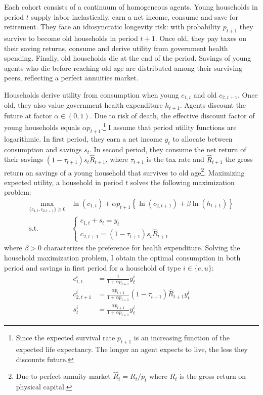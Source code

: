 Each cohort consists of a continuum of homogeneous agents. Young households in period $t$ supply labor inelastically, earn a net income, consume and save for retirement. They face an idiosyncratic longevity risk: with probability $p_{t+1}$ they survive to become old households in period $t+1$. Once old, they pay taxes on their saving returns, consume and derive utility from government health spending. Finally, old households die at the end of the period. Savings of young agents who die before reaching old age are distributed among their surviving peers, reflecting a perfect annuities market.

Households derive utility from consumption when young $c_{1,t}$ and old $c_{2,t+1}$. Once old, they also value government health expenditure $h_{t+1}$. Agents discount the future at factor $\alpha \in \left(0,1\right)$. Due to risk of death, the effective discount factor of young households equals $\alpha p_{t+1}$.\footnote{Since the expected survival rate $p_{t+1}$ is an increasing function of the expected life expectancy. The longer an agent expects to live, the less they discounts future.} I assume that period utility functions are logarithmic. In first period, they earn a net income $y_t$ to allocate between consumption and savings $s_t$. In second period, they consume the net return of their savings $(1-\tau_{t+1}) s_t \hat{R}_{t+1}$, where $\tau_{t+1}$ is the tax rate and $\hat{R}_{t+1}$ the gross return on savings of a young household that survives to old age\footnote{Due to perfect annuity market $\hat{R}_t = R_t/p_t$ where $R_t$ is the gross return on physical capital.}. Maximizing expected utility, a household in period $t$ solves the following maximization problem:
	\begin{align*}
		\max_{\lbrace c_{1,t}, c_{2,t+1} \rbrace \geq 0} &\ln(c_{1,t}) + \alpha p_{t+1}\left\lbrace \ln(c_{2,t+1}) + \beta \ln(h_{t+1}) \right\rbrace\\
		\text{s.t.} ~~ & \begin{cases}
		c_{1,t} + s_t = y_t \\
		c_{2,t+1} = (1-\tau_{t+1}) s_t \hat{R}_{t+1}
		\end{cases}
	\end{align*}
where $\beta>0$ characterizes the preference for health expenditure. Solving the household maximization problem, I obtain the optimal consumption in both period and savings in first period for a household of type $i \in \lbrace e, u \rbrace$:
	\begin{align*}
		c^i_{1,t} &= \frac{1}{1+\alpha p_{t+1}} y^i_{t} \\
		c^i_{2,t+1} &= \frac{\alpha p_{t+1}}{1+\alpha p_{t+1}}(1-\tau_{t+1})\hat{R}_{t+1}y^i_{t} \\
		s^i_t &= \frac{\alpha p_{t+1}}{1+\alpha p_{t+1}} y^i_t
	\end{align*}
